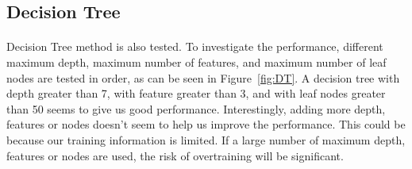 \documentclass[11pt]{article}
\begin{document}
\subsection{Decision Tree}
\paragraph{}Decision Tree method is also tested. To investigate the performance, different maximum depth, maximum number of features, and maximum number of leaf nodes are tested in order, as can be seen in Figure~\ref{fig:DT}. A decision tree with depth greater than 7, with feature greater than 3, and with leaf nodes greater than 50 seems to give us good performance. Interestingly, adding more depth, features or nodes doesn't seem to help us improve the performance. This could be because our training information is limited. If a large number of maximum depth, features or nodes are used, the risk of overtraining will be significant.
\end{document}
